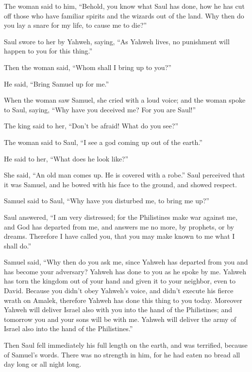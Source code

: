  The woman said to him, ``Behold, you know what Saul has
done, how he has cut off those who have familiar spirits and the wizards
out of the land. Why then do you lay a snare for my life, to cause me to
die?''

 Saul swore to her by Yahweh, saying, ``As Yahweh lives, no
punishment will happen to you for this thing.''

 Then the woman said, ``Whom shall I bring up to you?''

He said, ``Bring Samuel up for me.''

 When the woman saw Samuel, she cried with a loud voice;
and the woman spoke to Saul, saying, ``Why have you deceived me? For you
are Saul!''

 The king said to her, ``Don't be afraid! What do you
see?''

The woman said to Saul, ``I see a god coming up out of the earth.''

 He said to her, ``What does he look like?''

She said, ``An old man comes up. He is covered with a robe.'' Saul
perceived that it was Samuel, and he bowed with his face to the ground,
and showed respect.

 Samuel said to Saul, ``Why have you disturbed me, to bring
me up?''

Saul answered, ``I am very distressed; for the Philistines make war
against me, and God has departed from me, and answers me no more, by
prophets, or by dreams. Therefore I have called you, that you may make
known to me what I shall do.''

 Samuel said, ``Why then do you ask me, since Yahweh has
departed from you and has become your adversary?  Yahweh
has done to you as he spoke by me. Yahweh has torn the kingdom out of
your hand and given it to your neighbor, even to David. 
Because you didn't obey Yahweh's voice, and didn't execute his fierce
wrath on Amalek, therefore Yahweh has done this thing to you today.
 Moreover Yahweh will deliver Israel also with you into the
hand of the Philistines; and tomorrow you and your sons will be with me.
Yahweh will deliver the army of Israel also into the hand of the
Philistines.''

 Then Saul fell immediately his full length on the earth,
and was terrified, because of Samuel's words. There was no strength in
him, for he had eaten no bread all day long or all night long.

